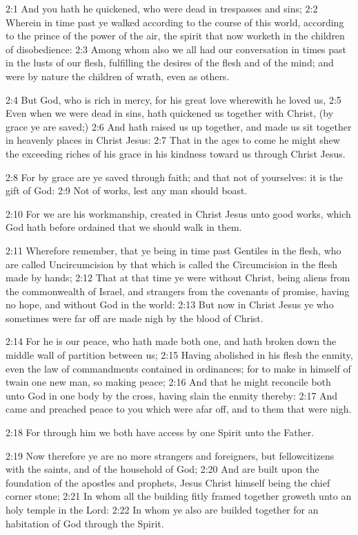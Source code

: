 2:1 And you hath he quickened, who were dead in trespasses and sins;
2:2 Wherein in time past ye walked according to the course of this
world, according to the prince of the power of the air, the spirit
that now worketh in the children of disobedience: 2:3 Among whom also
we all had our conversation in times past in the lusts of our flesh,
fulfilling the desires of the flesh and of the mind; and were by
nature the children of wrath, even as others.

2:4 But God, who is rich in mercy, for his great love wherewith he
loved us, 2:5 Even when we were dead in sins, hath quickened us
together with Christ, (by grace ye are saved;) 2:6 And hath raised us
up together, and made us sit together in heavenly places in Christ
Jesus: 2:7 That in the ages to come he might shew the exceeding riches
of his grace in his kindness toward us through Christ Jesus.

2:8 For by grace are ye saved through faith; and that not of
yourselves: it is the gift of God: 2:9 Not of works, lest any man
should boast.

2:10 For we are his workmanship, created in Christ Jesus unto good
works, which God hath before ordained that we should walk in them.

2:11 Wherefore remember, that ye being in time past Gentiles in the
flesh, who are called Uncircumcision by that which is called the
Circumcision in the flesh made by hands; 2:12 That at that time ye
were without Christ, being aliens from the commonwealth of Israel, and
strangers from the covenants of promise, having no hope, and without
God in the world: 2:13 But now in Christ Jesus ye who sometimes were
far off are made nigh by the blood of Christ.

2:14 For he is our peace, who hath made both one, and hath broken down
the middle wall of partition between us; 2:15 Having abolished in his
flesh the enmity, even the law of commandments contained in
ordinances; for to make in himself of twain one new man, so making
peace; 2:16 And that he might reconcile both unto God in one body by
the cross, having slain the enmity thereby: 2:17 And came and preached
peace to you which were afar off, and to them that were nigh.

2:18 For through him we both have access by one Spirit unto the
Father.

2:19 Now therefore ye are no more strangers and foreigners, but
fellowcitizens with the saints, and of the household of God; 2:20 And
are built upon the foundation of the apostles and prophets, Jesus
Christ himself being the chief corner stone; 2:21 In whom all the
building fitly framed together groweth unto an holy temple in the
Lord: 2:22 In whom ye also are builded together for an habitation of
God through the Spirit.

